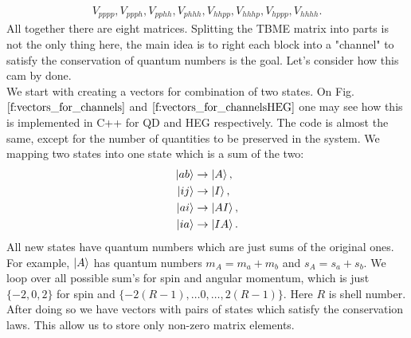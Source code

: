 \documentclass[twoside,english]{uiofysmaster}
\theoremstyle{definition}
\begin{document}
\begin{align}
V_{pppp},V_{ppph}, V_{pphh}, V_{phhh},V_{hhpp},V_{hhhp},V_{hppp},V_{hhhh}.
\end{align}
All together there are eight matrices. Splitting the TBME matrix into parts is not the only thing here, the main idea is to right each block into a "channel" to satisfy the conservation of quantum numbers is the goal. Let's consider how this cam by done.\\
We start with creating a vectors for combination of two states. On Fig. $\ref{f:vectors_for_channels}$ and $\ref{f:vectors_for_channelsHEG}$ one may see how this is implemented in C++ for QD and HEG respectively. The code is almost the same, except for the number of quantities to be preserved in the system. We mapping two states into one state which is a sum of the two:
\begin{align}
\ket{ab} &\rightarrow \ket{A}, \\
\ket{ij} &\rightarrow \ket{I}, \\
\ket{ai} &\rightarrow \ket{AI}, \\
\ket{ia} &\rightarrow \ket{IA}. \\
\end{align}
All new states have quantum numbers which are just sums of the original ones. For example, $\ket{A}$ has quantum numbers $m_A = m_a+m_b$ and  $s_A = s_a+s_b$. We loop over all possible sum's for spin and angular momentum, which is just $\{-2,0,2\}$ for spin and $\{-2(R-1), \dots 0, \dots , 2(R-1)\}$. Here $R$ is shell number. After doing so we have vectors with pairs of states which satisfy the conservation laws. This allow us to store only non-zero matrix elements.\\
\end{document}

